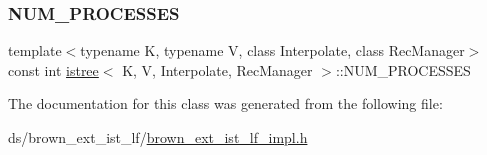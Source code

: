 \mbox{\label{classistree_a7a79626fbc040b5ee2958dab265d1254}} 
\subsubsection{\texorpdfstring{N\+U\+M\+\_\+\+P\+R\+O\+C\+E\+S\+S\+ES}{NUM\_PROCESSES}}
{\footnotesize\ttfamily template$<$typename K, typename V, class Interpolate, class Rec\+Manager$>$ \\
const int \hyperlink{classistree}{istree}$<$ K, V, Interpolate, Rec\+Manager $>$\+::N\+U\+M\+\_\+\+P\+R\+O\+C\+E\+S\+S\+ES}



The documentation for this class was generated from the following file\+:\begin{DoxyCompactItemize}
\item 
ds/brown\+\_\+ext\+\_\+ist\+\_\+lf/\hyperlink{brown__ext__ist__lf__impl_8h}{brown\+\_\+ext\+\_\+ist\+\_\+lf\+\_\+impl.\+h}\end{DoxyCompactItemize}
